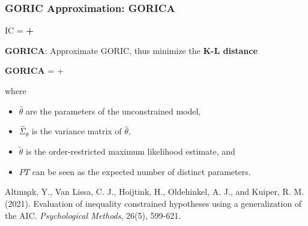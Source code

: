 \documentclass[10pt]{beamer}\usepackage[]{graphicx}\usepackage[]{xcolor}
\begin{document}
\begin{frame}
	\frametitle{GORIC Approximation: GORICA}
	
	\centerline{	IC = \textbf{{\color{orange}{model misfit}} + {\color{purple}{model complexity}}}}
	\vspace{.5 cm}
	
	{\textbf{GORICA}: Approximate GORIC, thus minimize the \textbf{K-L distance}}
	
	\vspace{0.5cm}
	\centerline{{\textbf{GORICA} ={} + \color{purple}{$2 PT$}}}
	
	\vspace{.5 cm}
	
	where 
	\begin{itemize}
			\item $\hat{\theta}$ are the parameters of the unconstrained model,
			\item $\hat{\Sigma}_{\theta}$ is the variance matrix of $\hat{\theta}$,
			\item $\tilde{\theta}$ is the order-restricted maximum likelihood estimate, and
			\item $PT$ can be seen as the expected number of distinct parameters. %
		\end{itemize}
		
\vspace{.5 cm}

	\footnotesize{
	Alt{\i}n{\i}\c{s}{\i}k, Y., Van Lissa, C. J., Hoijtink, H., Oldehinkel, A. J., and Kuiper, R. M. (2021). Evaluation of inequality constrained hypotheses using a generalization of the AIC. \emph{Psychological Methods}, 26(5), 599-621. %
	}
	
\end{frame}
%
\end{document}
